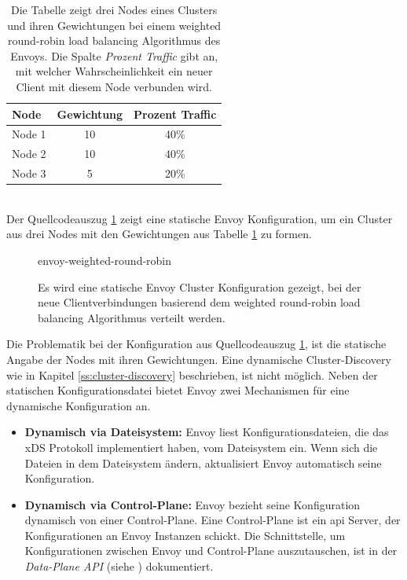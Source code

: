 \begin{table}[h!]
\centering
\renewcommand{\arraystretch}{1.5}
\begin{tabular}{|l|c|c|}
    \hline
    \textbf{Node} & \textbf{Gewichtung} & \textbf{Prozent Traffic} \\
    \hline
    \hline
    Node 1 & 10 & 40\% \\
    \hline
    Node 2 & 10 & 40\% \\
    \hline
    Node 3 & 5 & 20\% \\
    \hline
\end{tabular}
\caption{Die Tabelle zeigt drei Nodes eines Clusters und ihren Gewichtungen bei einem weighted round-robin load balancing Algorithmus des Envoys. Die Spalte \textit{Prozent Traffic} gibt an, mit welcher Wahrscheinlichkeit ein neuer Client mit diesem Node verbunden wird.}
\label{table:example-cluster-weight}
\end{table}
\\
Der Quellcodeauszug \ref{code:envoy-cluster-weight} zeigt eine statische Envoy Konfiguration, um ein Cluster aus drei Nodes mit den Gewichtungen aus Tabelle \ref{table:example-cluster-weight} zu formen.
\begin{figure}
    {envoy-weighted-round-robin}
    \caption{Es wird eine statische Envoy Cluster Konfiguration gezeigt, bei der neue Clientverbindungen basierend dem weighted round-robin load balancing Algorithmus verteilt werden.}
    \label{code:envoy-cluster-weight}
\end{figure}
\newpage\noindent
Die Problematik bei der Konfiguration aus Quellcodeauszug \ref{code:envoy-cluster-weight}, ist die statische Angabe der Nodes mit ihren Gewichtungen.
Eine dynamische Cluster-Discovery wie in Kapitel \ref{ss:cluster-discovery} beschrieben, ist nicht möglich.
Neben der statischen Konfigurationsdatei bietet Envoy zwei Mechanismen für eine dynamische Konfiguration an.
\begin{itemize}
  \item \textbf{Dynamisch via Dateisystem:} Envoy liest Konfigurationsdateien, die das xDS Protokoll implementiert haben, vom Dateisystem ein. Wenn sich die Dateien in dem Dateisystem ändern, aktualisiert Envoy automatisch seine Konfiguration.
    \cite{ConfigurationDynamicFilesystem}
  \item \textbf{Dynamisch via Control-Plane:} Envoy bezieht seine Konfiguration dynamisch von einer Control-Plane. Eine Control-Plane ist ein \ac{api} Server, der Konfigurationen an Envoy Instanzen schickt. Die Schnittstelle, um Konfigurationen zwischen Envoy und Control-Plane auszutauschen, ist in der \textit{Data-Plane API} (siehe \cite{EnvoyproxyDataplaneapi2021}) dokumentiert.
    \cite{ConfigurationDynamicControl}
\end{itemize}
